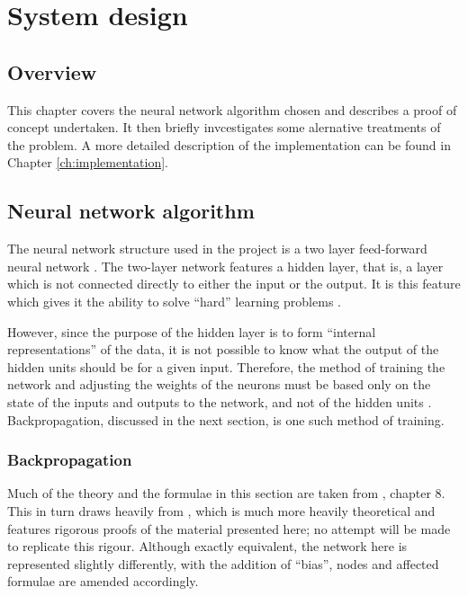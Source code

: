 \chapter{System design}
\label{ch:design}

\section{Overview}

This chapter covers the neural network algorithm chosen and describes a proof of concept undertaken.  It then briefly invcestigates some alernative treatments of the problem.  A more detailed description of the implementation can be found in Chapter \ref{ch:implementation}.

\section{Neural network algorithm}
\label{sec:nnalgorithm}
The neural network structure used in the project is a two layer feed-forward neural network \citep[p. 7]{Annema1995}.  The two-layer network features a hidden layer, that is, a layer which is not connected directly to either the input or the output.  It is this feature which gives it the ability to solve ``hard'' learning problems \citep[p. 134]{Aleksander1995}.

However, since the purpose of the hidden layer is to form ``internal representations'' of the data, it is not possible to know what the output of the hidden units should be for a given input.  Therefore, the method of training the network and adjusting the weights of the neurons must be based only on the state of the inputs and outputs to the network, and not of the hidden units \cite[p. 136]{Aleksander1995}.  Backpropagation, discussed in the next section, is one such method of training.

\subsection{Backpropagation}

Much of the theory and the formulae in this section are taken from \citet{Aleksander1995}, chapter 8.  This in turn draws heavily from \citet{Rumelhart1986}, which is much more heavily theoretical and features rigorous proofs of the material presented here; no attempt will be made to replicate this rigour.  Although exactly equivalent, the network here is represented slightly differently, with the addition of ``bias'', nodes and affected formulae are amended accordingly.

